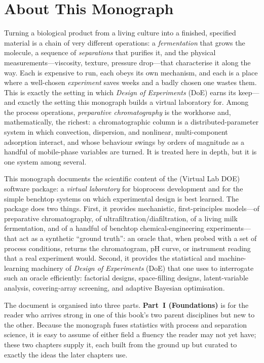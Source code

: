 \chapter*{About This Monograph}

Turning a biological product from a living culture into a finished, specified
material is a chain of very different operations: a \emph{fermentation} that grows
the molecule, a sequence of \emph{separations} that purifies it, and the physical
measurements---viscosity, texture, pressure drop---that characterise it along the
way. Each is expensive to run, each obeys its own mechanism, and each is a place
where a well-chosen \emph{experiment} saves weeks and a badly chosen one wastes
them. This is exactly the setting in which \emph{Design of Experiments} (DoE)
earns its keep---and exactly the setting this monograph builds a virtual
laboratory for. Among the process operations, \emph{preparative chromatography} is
the workhorse and, mathematically, the richest: a chromatographic column is a
distributed-parameter system in which convection, dispersion, and nonlinear,
multi-component adsorption interact, and whose behaviour swings by orders of
magnitude as a handful of mobile-phase variables are turned. It is treated here in
depth, but it is one system among several.

This monograph documents the scientific content of the 
(Virtual Lab DOE) software package: a \emph{virtual laboratory} for bioprocess
development and for the simple benchtop systems on which experimental design is
best learned. The package does two things. First, it provides mechanistic,
first-principles models---of preparative chromatography, of
ultrafiltration/diafiltration, of a living milk fermentation, and of a handful of
benchtop chemical-engineering experiments---that act as a synthetic ``ground
truth'': an oracle that, when probed with a set of process conditions, returns the
chromatogram, pH curve, or instrument reading that a real experiment would.
Second, it provides the statistical and machine-learning machinery of
\emph{Design of Experiments} (DoE) that one uses to interrogate such an oracle
efficiently: factorial designs, space-filling designs, latent-variable analysis,
covering-array screening, and adaptive Bayesian optimisation.

The document is organised into three parts. \textbf{Part~I (Foundations)} is for the
reader who arrives strong in one of this book's two parent disciplines but new to
the other. Because the monograph fuses statistics with process and separation
science, it is easy to assume of either field a fluency the reader may not yet
have; these two chapters supply it, each built from the ground up but curated to
exactly the ideas the later chapters use.

